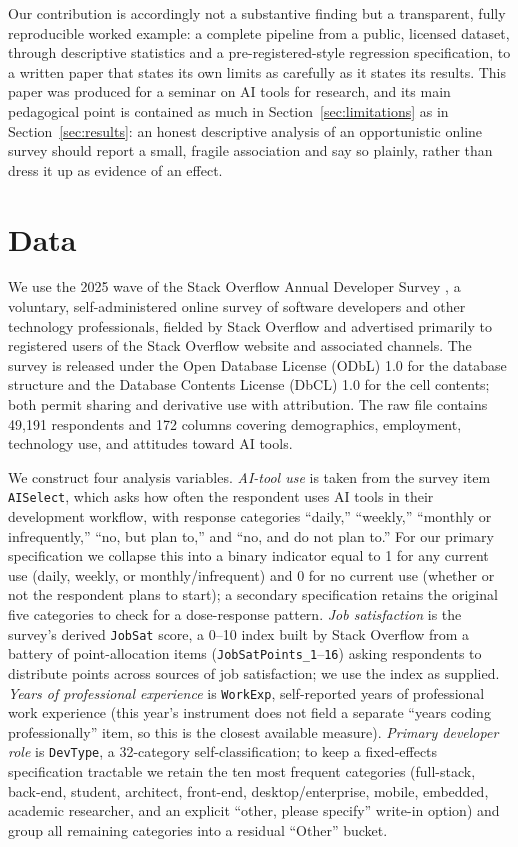 \documentclass[11pt]{article}
\begin{document}
Our contribution is accordingly not a substantive finding but a transparent,
fully reproducible worked example: a complete pipeline from a public,
licensed dataset, through descriptive statistics and a pre-registered-style
regression specification, to a written paper that states its own limits
as carefully as it states its results. This paper was produced for a
seminar on AI tools for research, and its main pedagogical point is
contained as much in Section~\ref{sec:limitations} as in Section~\ref{sec:results}:
an honest descriptive analysis of an opportunistic online survey should
report a small, fragile association and say so plainly, rather than dress
it up as evidence of an effect.

\section{Data}

We use the 2025 wave of the Stack Overflow Annual Developer Survey
\citep{stackoverflow2025survey}, a voluntary, self-administered online
survey of software developers and other technology professionals,
fielded by Stack Overflow and advertised primarily to registered users of
the Stack Overflow website and associated channels. The survey is released
under the Open Database License (ODbL) 1.0 for the database structure and
the Database Contents License (DbCL) 1.0 for the cell contents; both permit
sharing and derivative use with attribution. The raw file contains
49{,}191 respondents and 172 columns covering demographics, employment,
technology use, and attitudes toward AI tools.

We construct four analysis variables. \emph{AI-tool use} is taken from the
survey item \texttt{AISelect}, which asks how often the respondent uses AI
tools in their development workflow, with response categories ``daily,''
``weekly,'' ``monthly or infrequently,'' ``no, but plan to,'' and ``no, and
do not plan to.'' For our primary specification we collapse this into a
binary indicator equal to 1 for any current use (daily, weekly, or
monthly/infrequent) and 0 for no current use (whether or not the respondent
plans to start); a secondary specification retains the original five
categories to check for a dose-response pattern. \emph{Job satisfaction}
is the survey's derived \texttt{JobSat} score, a 0--10 index built by
Stack Overflow from a battery of point-allocation items
(\texttt{JobSatPoints\_1}--\texttt{16}) asking respondents to distribute
points across sources of job satisfaction; we use the index as supplied.
\emph{Years of professional experience} is \texttt{WorkExp}, self-reported
years of professional work experience (this year's instrument does not
field a separate ``years coding professionally'' item, so this is the
closest available measure). \emph{Primary developer role} is
\texttt{DevType}, a 32-category self-classification; to keep a
fixed-effects specification tractable we retain the ten most frequent
categories (full-stack, back-end, student, architect, front-end,
desktop/enterprise, mobile, embedded, academic researcher, and an explicit
``other, please specify'' write-in option) and group all remaining
categories into a residual ``Other'' bucket.
\end{document}
